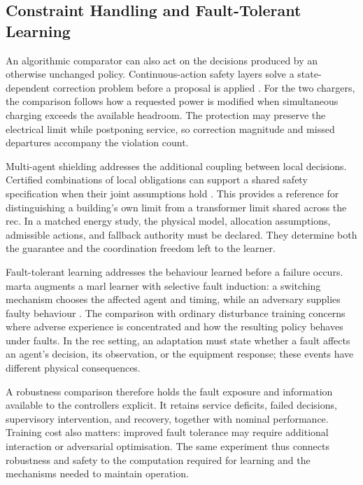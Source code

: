 \subsection{Constraint Handling and Fault-Tolerant Learning}
\label{sec:control-sota-protection}

An algorithmic comparator can also act on the decisions produced by an otherwise unchanged policy. Continuous-action safety layers solve a state-dependent correction problem before a proposal is applied \parencite{dalal2018safe}. For the two chargers, the comparison follows how a requested power is modified when simultaneous charging exceeds the available headroom. The protection may preserve the electrical limit while postponing service, so correction magnitude and missed departures accompany the violation count.

Multi-agent shielding addresses the additional coupling between local decisions. Certified combinations of local obligations can support a shared safety specification when their joint assumptions hold \parencite{elsayedaly2021shielding,adalat2026contracts}. This provides a reference for distinguishing a building's own limit from a transformer limit shared across the \gls{rec}. In a matched energy study, the physical model, allocation assumptions, admissible actions, and fallback authority must be declared. They determine both the guarantee and the coordination freedom left to the learner.

Fault-tolerant learning addresses the behaviour learned before a failure occurs. \gls{marta} augments a \gls{marl} learner with selective fault induction: a switching mechanism chooses the affected agent and timing, while an adversary supplies faulty behaviour \parencite{mguni2025faulttolerant}. The comparison with ordinary disturbance training concerns where adverse experience is concentrated and how the resulting policy behaves under faults. In the \gls{rec} setting, an adaptation must state whether a fault affects an agent's decision, its observation, or the equipment response; these events have different physical consequences.

A robustness comparison therefore holds the fault exposure and information available to the controllers explicit. It retains service deficits, failed decisions, supervisory intervention, and recovery, together with nominal performance. Training cost also matters: improved fault tolerance may require additional interaction or adversarial optimisation. The same experiment thus connects robustness and safety to the computation required for learning and the mechanisms needed to maintain operation.

